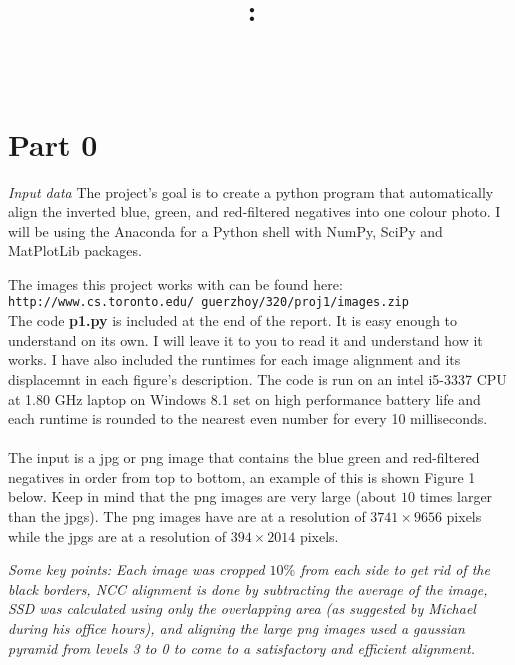 \documentclass{article}
\title{
\vspace{2in}
\textmd{\textbf{\hmwkClass:\ \hmwkTitle}}\\
\normalsize\vspace{0.1in}\small{\hmwkDueDate}\\
\vspace{0.1in}
\vspace{3in}
}
\author{\textbf{\hmwkAuthorName}}
\begin{document}
\maketitle
\clearpage


\section{Part 0}

\noindent \textit{Input data}
\newline
The project's goal is to create a python program that automatically align the inverted blue, green, and red-filtered negatives into one colour photo. I will be using the Anaconda for a Python shell with NumPy, SciPy and MatPlotLib packages.\newline

The images this project works with can be found here:\newline 
\texttt{http://www.cs.toronto.edu/~guerzhoy/320/proj1/images.zip}\newline
\\
The code \textbf{p1.py} is included at the end of the report. It is easy enough to understand on its own. I will leave it to you to read it and understand how it works. I have also included the runtimes for each image alignment and its displacemnt in each figure's description. The code is run on an intel i5-3337 CPU at 1.80 GHz laptop on Windows 8.1 set on high performance battery life and each runtime is rounded to the nearest even number for every 10 milliseconds.
\\\\
The input is a jpg or png image that contains the blue green and red-filtered negatives in order from top to bottom, an example of this is shown Figure 1 below. Keep in mind that the png images are very large (about $10$ times larger than the jpgs). The png images have are at a resolution of $3741 \times 9656$ pixels while the jpgs are at a resolution of $394 \times 2014$ pixels. \newline

\textit{Some key points: Each image was cropped $10\%$ from each side to get rid of the black borders, NCC alignment is done by subtracting the average of the image, SSD was calculated using only the overlapping area (as suggested by Michael during his office hours), and aligning the large png images used a gaussian pyramid from levels 3 to 0 to come to a satisfactory and efficient alignment.}
\end{document}
